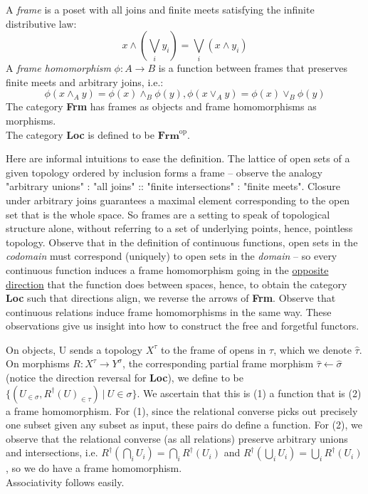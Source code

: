 \begin{rem}
A \emph{frame} is a poset with all joins and finite meets satisfying the infinite distributive law:
\[x \wedge (\bigvee\limits_{i}y_i) = \bigvee\limits_{i}(x \wedge y_i)\]
A \emph{frame homomorphism} $\phi: A \rightarrow B$ is a function between frames that preserves finite meets and arbitrary joins, i.e.:
\[\phi(x \wedge_A y) = \phi(x) \wedge_B \phi(y), \phi(x \vee_A y) = \phi(x) \vee_B \phi(y)\]
The category \textbf{Frm} has frames as objects and frame homomorphisms as morphisms.\\
The category \textbf{Loc} is defined to be $\textbf{Frm}^\text{op}$.
\end{rem}

\begin{remark}
Here are informal intuitions to ease the definition. The lattice of open sets of a given topology ordered by inclusion forms a frame -- observe the analogy "arbitrary unions" : "all joins" :: "finite intersections" : "finite meets". Closure under arbitrary joins guarantees a maximal element corresponding to the open set that is the whole space. So frames are a setting to speak of topological structure alone, without referring to a set of underlying points, hence, pointless topology. Observe that in the definition of continuous functions, open sets in the \emph{codomain} must correspond (uniquely) to open sets in the \emph{domain} -- so every continuous function induces a frame homomorphism going in the \underline{opposite direction} that the function does between spaces, hence, to obtain the category \textbf{Loc} such that directions align, we reverse the arrows of \textbf{Frm}. Observe that continuous relations induce frame homomorphisms in the same way. These observations give us insight into how to construct the free and forgetful functors.
\end{remark}

\begin{defn}
On objects, U sends a topology $X^\tau$ to the frame of opens in $\tau$, which we denote $\hat{\tau}$.\\
On morphisms $R: X^\tau \rightarrow Y^\sigma$, the corresponding partial frame morphism $\hat{\tau} \leftarrow \hat{\sigma}$ (notice the direction reversal for \textbf{Loc}), we define to be $\{(U_{\in \sigma},R^\dagger(U)_{\in \tau}) \ | \ U \in \sigma\}$. We ascertain that this is (1) a function that is (2) a frame homomorphism. For (1), since the relational converse picks out precisely one subset given any subset as input, these pairs do define a function. For (2), we observe that the relational converse (as all relations) preserve arbitrary unions and intersections, i.e. $R^\dagger(\bigcap\limits_i U_i) = \bigcap\limits_i R^\dagger(U_i)$ and $R^\dagger(\bigcup\limits_i U_i) = \bigcup\limits_i R^\dagger(U_i)$, so we do have a frame homomorphism.\\
Associativity follows easily.
\end{defn}

